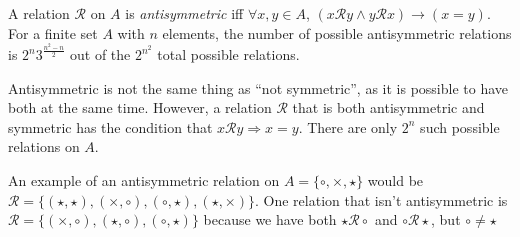 \documentclass[12pt]{article}
\begin{document}
A relation $\mathcal{R}$ on $A$ is \emph{antisymmetric} iff
$\forall x, y \in A$, $(x\mathcal{R}y \land y\mathcal{R}x)\rightarrow (x=y)$.
For a finite set $A$ with $n$ elements, the number of possible antisymmetric relations is $2^n 3^{\frac{n^2-n}{2}}$ out of the $2^{n^2}$ total possible
relations.

Antisymmetric is not the same thing as ``not symmetric'', as it is possible
to have both at the same time. However, a relation $\mathcal{R}$ that is both
antisymmetric and symmetric has the condition that $ x\mathcal{R}y \Rightarrow x=y $.
There are only $2^n$ such possible relations on $A$.

An example of an antisymmetric relation on $A = \{\circ, \times, \star\}$
would be $\mathcal{R} = \{(\star,\star),(\times,\circ),(\circ,\star),(\star,\times)\}$.
One relation that isn't antisymmetric is $\mathcal{R} = \{ (\times,\circ), (\star, \circ), (\circ,\star) \} $
because we have both $\star \mathcal{R} \circ$ and $\circ \mathcal{R} \star$, but $\circ \not = \star$
\end{document}
